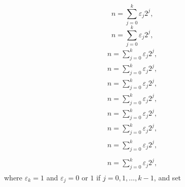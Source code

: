 \documentclass{amsart}
\numberwithin{equation}{section}
\begin{document}
{
\begin{equation*} \label{a35}
n=\sum_{j=0}^k\varepsilon_j2^j,
 \end{equation*}\fi  
{}\begin{equation}\label{a35}
n=\sum_{j=0}^k\varepsilon_j2^j,
\end{equation}\fi   
{}\begin{align*}\label{a35}
n=\sum_{j=0}^k\varepsilon_j2^j,
\end{align*}\fi   
{}\begin{align}\label{a35}
n=\sum_{j=0}^k\varepsilon_j2^j,
\end{align}\fi    
{}\begin{gather*}\label{a35}
n=\sum_{j=0}^k\varepsilon_j2^j,
\end{gather*}\fi  
{}\begin{gather}\label{a35}
n=\sum_{j=0}^k\varepsilon_j2^j,
\end{gather}\fi   
{}\begin{multline*}\label{a35}
n=\sum_{j=0}^k\varepsilon_j2^j,
\end{multline*}\fi  
{}\begin{multline}\label{a35}
n=\sum_{j=0}^k\varepsilon_j2^j,
\end{multline}\fi  
{}\begin{multline*}\begin{split}\label{a35}
n=\sum_{j=0}^k\varepsilon_j2^j,
\end{split}\end{multline*}\fi
{}\begin{multline}\begin{split}\label{a35}
n=\sum_{j=0}^k\varepsilon_j2^j,
\end{split}\end{multline}\fi
}
where $\varepsilon_k=1$ and $\varepsilon_j=0$ or $1$ if $j=0,1,\ldots,k-1$, and set
\end{document}
